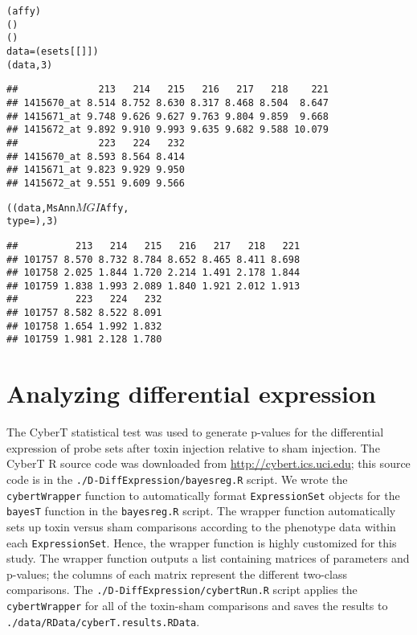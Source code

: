\begin{knitrout}
\color{fgcolor}\begin{kframe}
\begin{alltt}
(affy)
()
()
data = (esets[[]])
(data, 3)
\end{alltt}
\begin{verbatim}
##              213   214   215   216   217   218    221
## 1415670_at 8.514 8.752 8.630 8.317 8.468 8.504  8.647
## 1415671_at 9.748 9.626 9.627 9.763 9.804 9.859  9.668
## 1415672_at 9.892 9.910 9.993 9.635 9.682 9.588 10.079
##              223   224   232
## 1415670_at 8.593 8.564 8.414
## 1415671_at 9.823 9.929 9.950
## 1415672_at 9.551 9.609 9.566
\end{verbatim}
\begin{alltt}
((data, MsAnn$MGI$Affy, \\ type = ), 3)
\end{alltt}
\begin{verbatim}
##          213   214   215   216   217   218   221
## 101757 8.570 8.732 8.784 8.652 8.465 8.411 8.698
## 101758 2.025 1.844 1.720 2.214 1.491 2.178 1.844
## 101759 1.838 1.993 2.089 1.840 1.921 2.012 1.913
##          223   224   232
## 101757 8.582 8.522 8.091
## 101758 1.654 1.992 1.832
## 101759 1.981 2.128 1.780
\end{verbatim}
\end{kframe}
\end{knitrout}


\section{Analyzing differential expression}\label{S:DE2}

The CyberT statistical test \cite{Baldi:2001ul} was used to generate p-values for the
differential expression of probe sets after toxin injection relative to sham
injection. The CyberT R source code was downloaded from 
\url{http://cybert.ics.uci.edu}; this source code
is in the \texttt{./D-DiffExpression/bayesreg.R} script. We wrote the
\texttt{cybertWrapper} function to automatically format \texttt{ExpressionSet}
objects for the \texttt{bayesT} function in the \texttt{bayesreg.R} script. 
The wrapper function automatically sets up toxin versus sham comparisons according to the
phenotype data within each \texttt{ExpressionSet}. Hence, the wrapper function
is highly customized for this study. The wrapper function outputs
a list containing matrices of parameters and p-values; the columns of each
matrix represent the different two-class comparisons. The 
\texttt{./D-DiffExpression/cybertRun.R} script applies the \texttt{cybertWrapper}
for all of the toxin-sham comparisons and saves the results to 
\texttt{./data/RData/cyberT.results.RData}.

